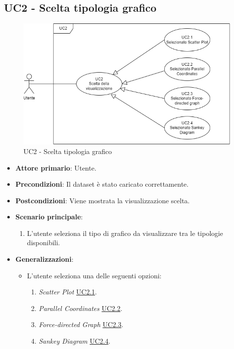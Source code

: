 
\subsection{UC2 - Scelta tipologia grafico}
\label{sec:UC2}
\begin{figure}[h!]
    \centering
    \includegraphics[scale=0.50]{../../assets/Selezione_tipo_grafico.png}
    \caption{UC2 - Scelta tipologia grafico}
\end{figure}
\begin{itemize}
    \item \textbf{Attore primario}: Utente.
    \item \textbf{Precondizioni}: Il dataset è stato caricato correttamente.
    \item \textbf{Postcondizioni}: Viene mostrata la visualizzazione scelta.
    \item \textbf{Scenario principale}:
          \begin{enumerate}
              \item L'utente seleziona il tipo di grafico da visualizzare tra le tipologie disponibili.
          \end{enumerate}
    \item \textbf{Generalizzazioni}:
    \begin{itemize}
        \item L'utente seleziona una delle seguenti opzioni:
                \begin{enumerate}
                    \item \textit{Scatter Plot} \hyperref[sec:UC2.1]{UC2.1}.
                    \item \textit{Parallel Coordinates} \hyperref[sec:UC2.2]{UC2.2}.
                    \item \textit{Force-directed Graph} \hyperref[sec:UC2.3]{UC2.3}.
                    \item \textit{Sankey Diagram} \hyperref[sec:UC2.4]{UC2.4}.
                \end{enumerate}
    \end{itemize} 
\end{itemize}

